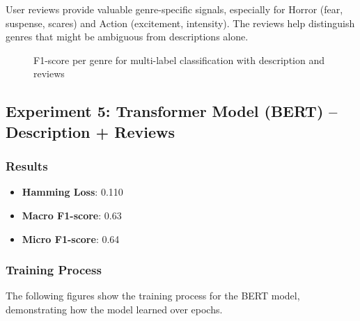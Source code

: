 \documentclass[12pt,a4paper]{article}
\begin{document}
User reviews provide valuable genre-specific signals, especially for Horror (fear, suspense, scares) and Action (excitement, intensity). The reviews help distinguish genres that might be ambiguous from descriptions alone.

\begin{figure}[h]
\centering
{}
\caption{F1-score per genre for multi-label classification with description and reviews}
\label{fig:exp4_per_class}
\end{figure}

\subsection{Experiment 5: Transformer Model (BERT) -- Description + Reviews}

\subsubsection{Results}

\begin{itemize}

    \item \textbf{Hamming Loss}: 0.110

    \item \textbf{Macro F1-score}: 0.63

    \item \textbf{Micro F1-score}: 0.64

\end{itemize}

\subsubsection{Training Process}

The following figures show the training process for the BERT model, demonstrating how the model learned over epochs.
\end{document}

